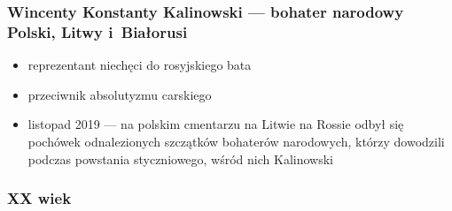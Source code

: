 \subsubsection*{Wincenty Konstanty Kalinowski --- bohater narodowy Polski, Litwy i~Białorusi}
\begin{itemize}
    \item reprezentant niechęci do rosyjskiego bata
    \item przeciwnik absolutyzmu carskiego
    \item listopad 2019 --- na polskim cmentarzu na Litwie na Rossie odbył się pochówek odnalezionych szczątków bohaterów narodowych, którzy dowodzili podczas powstania styczniowego, wśród nich Kalinowski
\end{itemize}
\subsubsection*{XX wiek}
